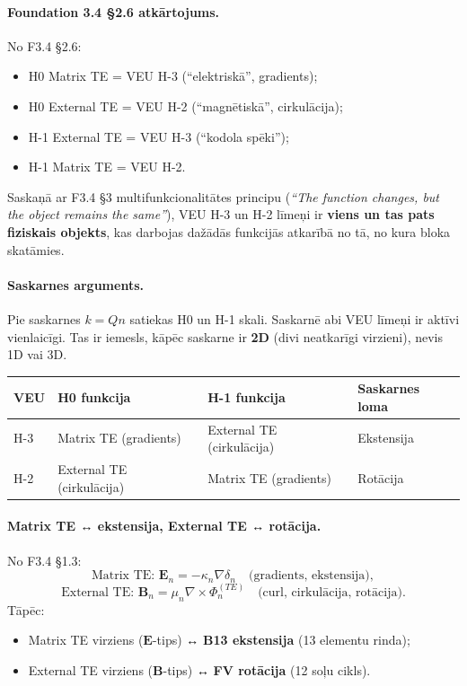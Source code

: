 \documentclass[12pt,a4paper]{article}
\begin{document}
\paragraph{Foundation 3.4 §2.6 atkārtojums.}
No F3.4 §2.6:
\begin{itemize}
    \item H0 Matrix TE = VEU H-3 (``elektriskā'', gradients);
    \item H0 External TE = VEU H-2 (``magnētiskā'', cirkulācija);
    \item H-1 External TE = VEU H-3 (``kodola spēki'');
    \item H-1 Matrix TE = VEU H-2.
\end{itemize}
Saskaņā ar F3.4 §3 multifunkcionalitātes principu (\textit{``The function changes, but the object remains the same''}), VEU H-3 un H-2 līmeņi ir \textbf{viens un tas pats fiziskais objekts}, kas darbojas dažādās funkcijās atkarībā no tā, no kura bloka skatāmies.

\paragraph{Saskarnes arguments.}
Pie saskarnes $k = Qn$ satiekas H0 un H-1 skali. Saskarnē abi VEU līmeņi ir aktīvi vienlaicīgi. Tas ir iemesls, kāpēc saskarne ir \textbf{2D} (divi neatkarīgi virzieni), nevis 1D vai 3D.

\begin{table}[h]
\centering
\begin{tabular}{|l|l|l|l|}
\hline
\textbf{VEU} & \textbf{H0 funkcija} & \textbf{H-1 funkcija} & \textbf{Saskarnes loma} \\
\hline
H-3 & Matrix TE (gradients) & External TE (cirkulācija) & Ekstensija \\
H-2 & External TE (cirkulācija) & Matrix TE (gradients) & Rotācija \\
\hline
\end{tabular}
\end{table}

\paragraph{Matrix TE ↔ ekstensija, External TE ↔ rotācija.}
No F3.4 §1.3:
\[
\text{Matrix TE: } \mathbf{E}_n = -\kappa_n \nabla \delta_n \quad \text{(gradients, ekstensija)},
\]
\[
\text{External TE: } \mathbf{B}_n = \mu_n \nabla \times \Phi_n^{(TE)} \quad \text{(curl, cirkulācija, rotācija)}.
\]
Tāpēc:
\begin{itemize}
    \item Matrix TE virziens ($\mathbf{E}$-tips) ↔ \textbf{B13 ekstensija} (13 elementu rinda);
    \item External TE virziens ($\mathbf{B}$-tips) ↔ \textbf{FV rotācija} (12 soļu cikls).
\end{itemize}
\end{document}
